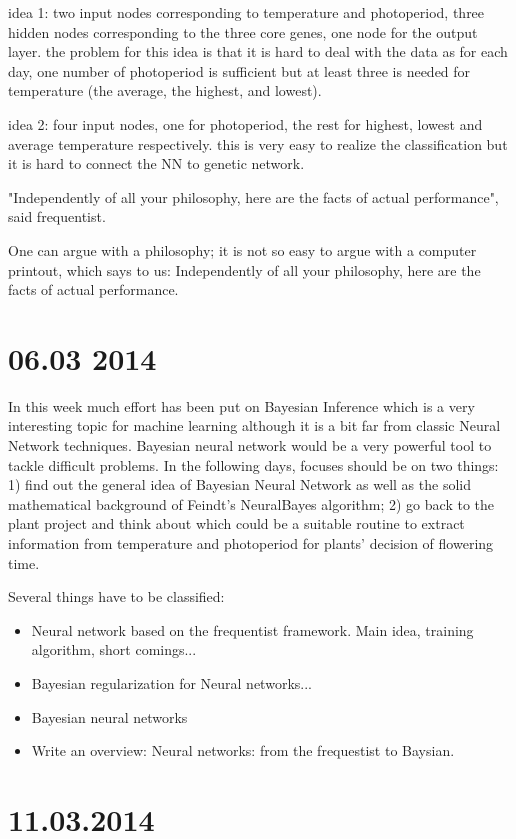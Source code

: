 \documentclass[paper=a4, fontsize=12pt]{scrartcl}	%
\numberwithin{equation}{section}					%
\numberwithin{figure}{section}					%
\numberwithin{table}{section}					%
\begin{document}
idea 1: two input nodes corresponding to temperature and photoperiod, three hidden nodes corresponding to the three core genes, one node for the output layer. the problem for this idea is that it is hard to deal with the data as for each day, one number of photoperiod is sufficient but at least three is needed for temperature (the average, the highest, and lowest). 

idea 2: four input nodes, one for photoperiod, the rest for highest, lowest and average temperature respectively. this is very easy to realize the classification but it is hard to connect the NN to genetic network. 


"Independently of all your philosophy, here are the facts of actual performance", said frequentist. 

One can argue with a philosophy; it is not so easy to argue with a computer printout, which says to us: Independently of all your philosophy, here are the facts of actual performance.


\section{06.03 2014}

In this week much effort has been put on Bayesian Inference which is a very interesting topic for machine learning although it is a bit far from classic Neural Network techniques. Bayesian neural network would be a very powerful tool to tackle difficult problems. In the following days, focuses should be on two things: 1) find out the general idea of Bayesian Neural Network as well as the solid mathematical background of Feindt's NeuralBayes algorithm; 2) go back to the plant project and think about which could be a suitable routine to extract information from temperature and photoperiod for plants' decision of flowering time. 

Several things have to be classified:
\begin{itemize}
\item Neural network based on the frequentist framework. Main idea, training algorithm, short comings...
\item Bayesian regularization for Neural networks...
\item Bayesian neural networks
\item Write an overview: Neural networks: from the frequestist to Baysian. 
\end{itemize}

\section{11.03.2014}
\end{document}
